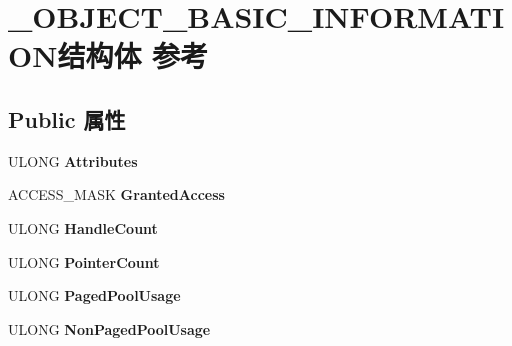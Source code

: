 \hypertarget{struct___o_b_j_e_c_t___b_a_s_i_c___i_n_f_o_r_m_a_t_i_o_n}{}\section{\+\_\+\+O\+B\+J\+E\+C\+T\+\_\+\+B\+A\+S\+I\+C\+\_\+\+I\+N\+F\+O\+R\+M\+A\+T\+I\+O\+N结构体 参考}
\label{struct___o_b_j_e_c_t___b_a_s_i_c___i_n_f_o_r_m_a_t_i_o_n}
\subsection*{Public 属性}
\begin{DoxyCompactItemize}
\item 
\mbox{\label{struct___o_b_j_e_c_t___b_a_s_i_c___i_n_f_o_r_m_a_t_i_o_n_a2e020ac76b79fae052ec97c6e54124dc}} 
U\+L\+O\+NG {\bfseries Attributes}
\item 
\mbox{\label{struct___o_b_j_e_c_t___b_a_s_i_c___i_n_f_o_r_m_a_t_i_o_n_acb81bcdf43ad13fa65075da8a0fd703a}} 
A\+C\+C\+E\+S\+S\+\_\+\+M\+A\+SK {\bfseries Granted\+Access}
\item 
\mbox{\label{struct___o_b_j_e_c_t___b_a_s_i_c___i_n_f_o_r_m_a_t_i_o_n_ad825cdbeb7c32bc1df8536deb67aa38f}} 
U\+L\+O\+NG {\bfseries Handle\+Count}
\item 
\mbox{\label{struct___o_b_j_e_c_t___b_a_s_i_c___i_n_f_o_r_m_a_t_i_o_n_ad8597b677f6503e4983da7150e7fb4f6}} 
U\+L\+O\+NG {\bfseries Pointer\+Count}
\item 
\mbox{\label{struct___o_b_j_e_c_t___b_a_s_i_c___i_n_f_o_r_m_a_t_i_o_n_ae2d22713b4fd09bc8429e8b925696149}} 
U\+L\+O\+NG {\bfseries Paged\+Pool\+Usage}
\item 
\mbox{\label{struct___o_b_j_e_c_t___b_a_s_i_c___i_n_f_o_r_m_a_t_i_o_n_afbfd7bad0a7dabeb509049d24b368eea}} 
U\+L\+O\+NG {\bfseries Non\+Paged\+Pool\+Usage}

\end{DoxyCompactItemize}
